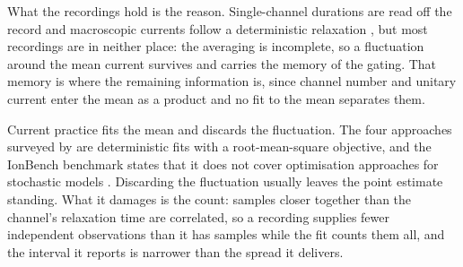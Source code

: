 %

What the recordings hold is the reason. Single-channel durations are read off the record
\citep{neher1977conductance,colquhoun1981stochastic} and macroscopic currents follow a deterministic
relaxation \citep{hodgkin1952quantitative}, but most recordings are in neither place: the averaging
is incomplete, so a fluctuation around the mean current survives and carries the memory of the
gating. That memory is where the remaining information is, since channel number and unitary current
enter the mean as a product and no fit to the mean separates them.

Current practice fits the mean and discards the fluctuation. The four approaches surveyed by
\citet{clerx2019four} are deterministic fits with a root-mean-square objective, and the IonBench
benchmark states that it does not cover optimisation approaches for stochastic models
\citep{owen2025ionbench}. Discarding the fluctuation usually leaves the point estimate standing.
What it damages is the count: samples closer together than the channel's relaxation time are
correlated, so a recording supplies fewer independent observations than it has samples while the fit
counts them all, and the interval it reports is narrower than the spread it delivers.

